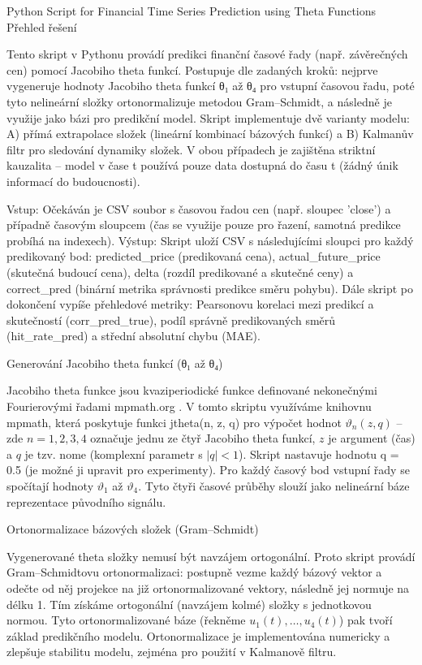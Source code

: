 Python Script for Financial Time Series Prediction using Theta Functions
Přehled řešení

Tento skript v Pythonu provádí predikci finanční časové řady (např. závěrečných cen) pomocí Jacobiho theta funkcí. Postupuje dle zadaných kroků: nejprve vygeneruje hodnoty Jacobiho theta funkcí θ₁ až θ₄ pro vstupní časovou řadu, poté tyto nelineární složky ortonormalizuje metodou Gram–Schmidt, a následně je využije jako bázi pro predikční model. Skript implementuje dvě varianty modelu: A) přímá extrapolace složek (lineární kombinací bázových funkcí) a B) Kalmanův filtr pro sledování dynamiky složek. V obou případech je zajištěna striktní kauzalita – model v čase t používá pouze data dostupná do času t (žádný únik informací do budoucnosti).

Vstup: Očekáván je CSV soubor s časovou řadou cen (např. sloupec 'close') a případně časovým sloupcem (čas se využije pouze pro řazení, samotná predikce probíhá na indexech).
Výstup: Skript uloží CSV s následujícími sloupci pro každý predikovaný bod: predicted_price (predikovaná cena), actual_future_price (skutečná budoucí cena), delta (rozdíl predikované a skutečné ceny) a correct_pred (binární metrika správnosti predikce směru pohybu). Dále skript po dokončení vypíše přehledové metriky: Pearsonovu korelaci mezi predikcí a skutečností (corr_pred_true), podíl správně predikovaných směrů (hit_rate_pred) a střední absolutní chybu (MAE).

Generování Jacobiho theta funkcí (θ₁ až θ₄)

Jacobiho theta funkce jsou kvaziperiodické funkce definované nekonečnými Fourierovými řadami
mpmath.org
. V tomto skriptu využíváme knihovnu mpmath, která poskytuje funkci jtheta(n, z, q) pro výpočet hodnot $\vartheta_n(z,q)$ – zde $n=1,2,3,4$ označuje jednu ze čtyř Jacobiho theta funkcí, $z$ je argument (čas) a $q$ je tzv. nome (komplexní parametr s $|q|<1$). Skript nastavuje hodnotu q = 0.5 (je možné ji upravit pro experimenty). Pro každý časový bod vstupní řady se spočítají hodnoty $\vartheta_1$ až $\vartheta_4$. Tyto čtyři časové průběhy slouží jako nelineární báze reprezentace původního signálu.

Ortonormalizace bázových složek (Gram–Schmidt)

Vygenerované theta složky nemusí být navzájem ortogonální. Proto skript provádí Gram–Schmidtovu ortonormalizaci: postupně vezme každý bázový vektor a odečte od něj projekce na již ortonormalizované vektory, následně jej normuje na délku 1. Tím získáme ortogonální (navzájem kolmé) složky s jednotkovou normou. Tyto ortonormalizované báze (řekněme $u_1(t), \dots, u_4(t)$) pak tvoří základ predikčního modelu. Ortonormalizace je implementována numericky a zlepšuje stabilitu modelu, zejména pro použití v Kalmanově filtru.

